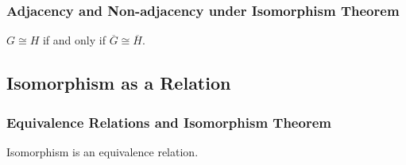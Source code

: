 \subsubsection*{Adjacency and Non-adjacency under Isomorphism Theorem}
$G \cong H$ if and only if $\overline{G} \cong \overline{H}$.

\subsection{Isomorphism as a Relation}

\subsubsection*{Equivalence Relations and Isomorphism Theorem}
Isomorphism is an equivalence relation.
